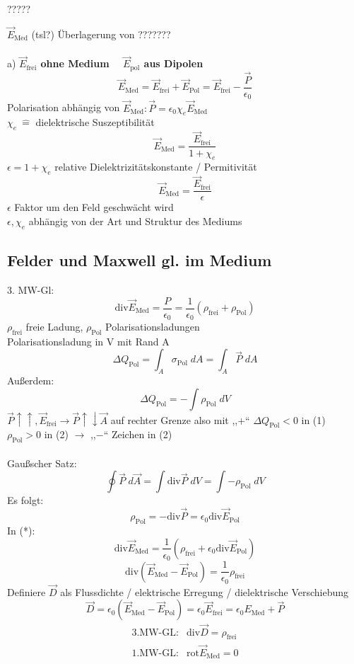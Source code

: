 \documentclass[titlepage,12pt,a4paper,ngerman]{report}
\newcommand{\tx}[1]{\textrm{#1}}
\begin{document}

?????

$\vec{E}_{\tx{Med}}$ (tsl?) Überlagerung von ???????\\\\
a)  \textbf{$\vec{E}_{\tx{frei}}$ ohne Medium $\quad \vec{E}_{\tx{pol}}$ aus Dipolen}
$$\vec{E}_{\tx{Med}} = \vec{E}_{\tx{frei}} + \vec{E}_{\tx{Pol}} = \vec{E}_{\tx{frei}} - \frac{\vec{P}}{\epsilon_0}$$
Polarisation abhängig von $ \vec{E}_{\tx{Med}}: \vec{P} = \epsilon_0 \chi_e \vec{E}_{\tx{Med}}$\\
$\chi_e\  \widehat{=}$ dielektrische Suszeptibilität
$$\vec{E}_{\tx{Med}} = \frac{\vec{E}_{\tx{frei}}}{1+\chi_e}$$
$\epsilon = 1+ \chi_e$  relative Dielektrizitätskonstante / Permitivität\\
$$\vec{E}_{\tx{Med}} = \frac{\vec{E}_{\tx{frei}}}{\epsilon}$$
$\epsilon$ Faktor um den Feld geschwächt wird\\
$\epsilon,\chi_e$ abhängig von der Art und Struktur des Mediums

\subsection{Felder und Maxwell gl. im Medium}
3. MW-Gl: 
\begin{equation*}
\tx{div} \vec{E}_{\tx{Med}} = \frac{P}{\epsilon_0} = \frac{1}{\epsilon_0}(\rho_{\tx{frei}} + \rho_{\tx{Pol}}) \tag{$ * $}
\end{equation*}
$\rho_{\tx{frei}}$ freie Ladung, $\rho_{\tx{Pol}}$ Polarisationsladungen\\
Polarisationsladung in V mit Rand A
\begin{equation*}
\Delta Q_{\tx{Pol}} = \int_A \sigma_{\tx{Pol}} \;dA = \int_A \vec{P} \; dA \tag{1}
\end{equation*}
Außerdem:
\begin{equation*}
\Delta Q_{\tx{Pol}} = -\int \rho_{\tx{Pol}} \; dV \tag{2}
\end{equation*}
$\vec{P}\uparrow\uparrow,\vec{E}_{\tx{frei}} \rightarrow \vec{P} \uparrow\downarrow \vec{A}$ auf rechter Grenze also mit ,,+`` $\Delta Q_{\tx{Pol}} < 0$ in (1)\\
$\rho_{\tx{Pol}} > 0$ in (2) $\rightarrow$ ,,$-$`` Zeichen in (2)\\\\
Gaußscher Satz:
$$\oint \vec{P}\; d\vec{A} = \int \tx{div} \vec{P} \; dV = \int - \rho_{\tx{Pol}} \; dV$$
Es folgt: $$\rho_{\tx{Pol}} = - \tx{div} \vec{P} = \epsilon_0 \tx{div} \vec{E}_{\tx{Pol}}$$
In (*): $$\tx{div}\vec{E}_{\tx{Med}} = \frac{1}{\epsilon_0} (\rho_{\tx{frei}} + \epsilon_0 \tx{div}\vec{E}_{\tx{Pol}})$$
$$\tx{div}(\vec{E}_{\tx{Med}} - \vec{E}_{\tx{Pol}}) = \frac{1}{\epsilon_0} \rho_{\tx{frei}}$$
Definiere  $\vec{D}$ als Flussdichte / elektrische Erregung / dielektrische Verschiebung
$$ \vec{D} = \epsilon_0(\vec{E}_{\tx{Med}} - \vec{E}_{\tx{Pol}}) = \epsilon_0 \vec{E}_{\tx{frei}} = \epsilon_0 E_{\tx{Med}} + \vec{P}$$
$$\boxed{\begin{array}{ll}
\tx{3.MW-GL}: & \tx{div}\vec{D} = \rho_\tx{frei} \\
\tx{1.MW-GL}: & \tx{rot}\vec{E}_{\tx{Med}} = 0
\end{array}
}$$
\end{document}
